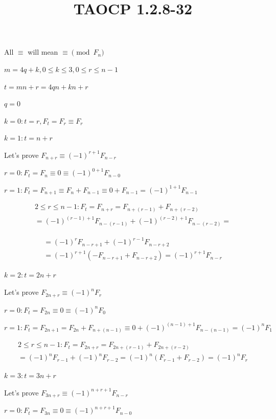 \documentclass{article}
\title{TAOCP 1.2.8\mbox{-}32}
\begin{document}
\maketitle

All \( \equiv \) will mean \( \equiv \pmod F_{n} \)

\( m = 4q+k, 0 \leq k \leq 3, 0 \leq r \leq n -1 \)

\( t = mn + r = 4qn + kn + r \)

\( q = 0 \)

\( k = 0: t = r, F_{t} = F_{r} \equiv F_{r} \)

\( k = 1: t = n + r \)

Let's prove \( F_{n+r} \equiv {(-1)}^{r+1}F_{n-r} \)

\( r = 0: F_{t}=F_{n} \equiv 0 \equiv {(-1)}^{0+1}F_{n-0} \)

\( r = 1: F_{t}=F_{n+1} \equiv F_{n} + F_{n-1} \equiv 0 + F_{n-1} = {(-1)}^{1+1}F_{n-1} \)

\begin{multline*}
2 \leq r \leq n - 1: F_{t} = F_{n+r} = F_{n+(r-1)} + F_{n+(r-2)} \\
= {(-1)}^{(r-1)+1}F_{n-(r-1)} + {(-1)}^{(r-2)+1}F_{n-(r-2)} =
\end{multline*}

\begin{multline*}
= {(-1)}^{r}F_{n-r+1} + {(-1)}^{r-1}F_{n-r+2} \\
= {(-1)}^{r+1}(-F_{n-r+1} + F_{n-r+2}) = {(-1)}^{r+1}F_{n-r}
\end{multline*}

\( k = 2: t = 2n + r \)

Let's prove \( F_{2n+r} \equiv {(-1)}^{n}F_{r} \)

\( r = 0: F_{t}=F_{2n} \equiv 0 \equiv {(-1)}^{n}F_{0} \)

\[ r = 1: F_{t}=F_{2n+1} = F_{2n} + F_{n+(n-1)} \equiv 0 + {(-1)}^{(n-1)+1}F_{n-(n-1)} = {(-1)}^{n}F_{1} \]

\begin{multline*}
2 \leq r \leq n - 1: F_{t} = F_{2n+r} = F_{2n+(r-1)} + F_{2n+(r-2)} \\
= {(-1)}^{n}F_{r-1} + {(-1)}^{n}F_{r-2} = {(-1)}^{n}(F_{r-1} + F_{r-2}) = {(-1)}^{n}F_{r}
\end{multline*}

\( k = 3: t = 3n + r \)

Let's prove \( F_{3n+r} \equiv {(-1)}^{n+r+1}F_{n-r} \)

\( r = 0: F_{t}=F_{3n} \equiv 0 \equiv {(-1)}^{n+r+1}F_{n-0} \)
\end{document}
